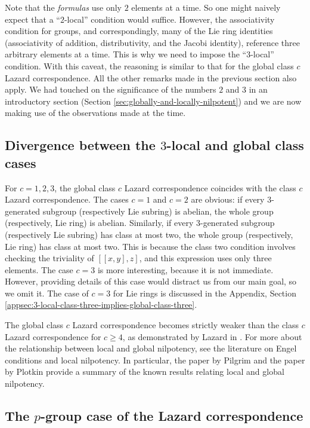 Note that the {\em formulas} use only $2$ elements at a time. So one
might naively expect that a ``$2$-local'' condition would
suffice. However, the associativity condition for groups, and
correspondingly, many of the Lie ring identities (associativity of
addition, distributivity, and the Jacobi identity), reference three
arbitrary elements at a time. This is why we need to impose the
``$3$-local'' condition. With this caveat, the reasoning is similar to
that for the global class $c$ Lazard correspondence. All the other
remarks made in the previous section also apply. We had touched on the
significance of the numbers $2$ and $3$ in an introductory section
(Section \ref{sec:globally-and-locally-nilpotent}) and we are now
making use of the observations made at the time.

\subsection{Divergence between the $3$-local and global class cases}

For $c = 1,2,3$, the global class $c$ Lazard correspondence coincides
with the class $c$ Lazard correspondence. The cases $c = 1$ and $c =
2$ are obvious: if every $3$-generated subgroup (respectively Lie
subring) is abelian, the whole group (respectively, Lie ring) is
abelian. Similarly, if every $3$-generated subgroup (respectively Lie
subring) has class at most two, the whole group (respectively, Lie
ring) has class at most two. This is because the class two condition
involves checking the triviality of $[[x,y],z]$, and this expression
uses only three elements. The case $c = 3$ is more interesting,
because it is not immediate. However, providing details of this case
would distract us from our main goal, so we omit it. The case of $c =
3$ for Lie rings is discussed in the Appendix,
Section \ref{appsec:3-local-class-three-implies-global-class-three}.

The global class $c$ Lazard correspondence becomes strictly weaker
than the class $c$ Lazard correspondence for $c \ge 4$, as
demonstrated by Lazard in \cite{Lazardsoriginal}. For more about the
relationship between local and global nilpotency, see the literature
on Engel conditions and local nilpotency. In particular, the paper
\cite{Pilgrim} by Pilgrim and the paper \cite{Plotkin} by Plotkin
provide a summary of the known results relating local and global
nilpotency.

\subsection{The $p$-group case of the Lazard correspondence}

